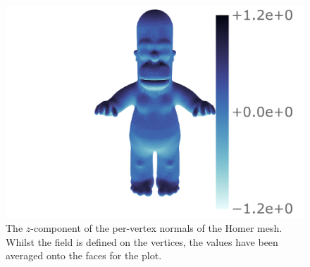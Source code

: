 \begin{figure}[htpb]
	\hspace{35mm}\capstart{}
	\includegraphics[trim={156 8 21 6},clip,width=.7\textwidth]{homer_field.pdf}
	\caption[
		An example field on the Homer mesh
	]{
		The \(z\)-component of the per-vertex normals of the Homer mesh.
		Whilst the field is defined on the vertices, the values have been averaged onto the faces for the plot.
	}\label{fig:chapter5_homer_data}
\end{figure}
